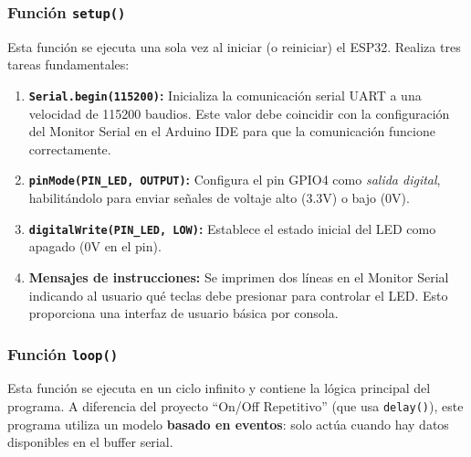 \documentclass[12pt,a4paper]{article}
\begin{document}
\subsubsection*{Función \texttt{setup()}}
Esta función se ejecuta una sola vez al iniciar (o reiniciar) el ESP32. Realiza tres tareas fundamentales:

\begin{enumerate}
    \item \textbf{\texttt{Serial.begin(115200)}:} Inicializa la comunicación serial UART a una velocidad de 115200 baudios. Este valor debe coincidir con la configuración del Monitor Serial en el Arduino IDE para que la comunicación funcione correctamente.
    
    \item \textbf{\texttt{pinMode(PIN\_LED, OUTPUT)}:} Configura el pin GPIO4 como \textit{salida digital}, habilitándolo para enviar señales de voltaje alto (3.3V) o bajo (0V).
    
    \item \textbf{\texttt{digitalWrite(PIN\_LED, LOW)}:} Establece el estado inicial del LED como apagado (0V en el pin).
    
    \item \textbf{Mensajes de instrucciones:} Se imprimen dos líneas en el Monitor Serial indicando al usuario qué teclas debe presionar para controlar el LED. Esto proporciona una interfaz de usuario básica por consola.
\end{enumerate}

\subsubsection*{Función \texttt{loop()}}
Esta función se ejecuta en un ciclo infinito y contiene la lógica principal del programa. A diferencia del proyecto ``On/Off Repetitivo'' (que usa \texttt{delay()}), este programa utiliza un modelo \textbf{basado en eventos}: solo actúa cuando hay datos disponibles en el buffer serial.
\end{document}
